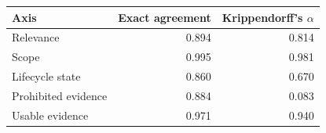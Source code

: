 \begin{tabular}{lrr}
\toprule
Axis & Exact agreement & Krippendorff's $\alpha$ \\
\midrule
Relevance & 0.894 & 0.814 \\
Scope & 0.995 & 0.981 \\
Lifecycle state & 0.860 & 0.670 \\
Prohibited evidence & 0.884 & 0.083 \\
Usable evidence & 0.971 & 0.940 \\
\bottomrule
\end{tabular}
